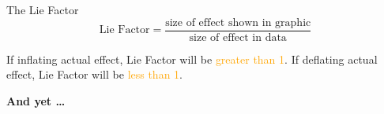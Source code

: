 \documentclass[
  ignorenonframetext,
]{beamer}
\begin{document}
\begin{frame}{}
\label{section-3}
\end{frame}

\begin{frame}{The Lie Factor}
\label{the-lie-factor}
\begin{equation*}
\text{Lie Factor} = \frac{\text{size of effect shown in graphic}}{\text{size of effect in data}}
\end{equation*}

If inflating actual effect, Lie Factor will be
\textcolor{orange}{greater than 1}. If deflating actual effect, Lie
Factor will be \textcolor{orange}{less than 1}.
\end{frame}

\begin{frame}{}
\label{section-4}
\centering

\huge \textbf{And yet \ldots{}}
\end{frame}

\begin{frame}{}
\label{section-5}
\end{frame}
\end{document}
